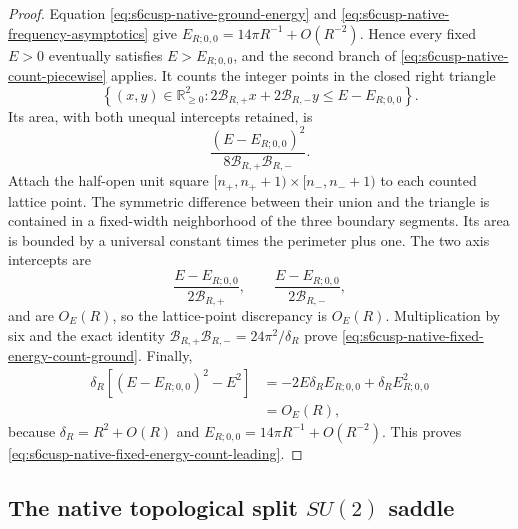 \begin{proof}
Equation \eqref{eq:s6cusp-native-ground-energy} and
\eqref{eq:s6cusp-native-frequency-asymptotics} give
\(E_{R;0,0}=14\pi R^{-1}+O(R^{-2})\).  Hence every fixed \(E>0\)
eventually satisfies \(E>E_{R;0,0}\), and the second branch of
\eqref{eq:s6cusp-native-count-piecewise} applies.  It counts the integer
points in the closed right triangle
\begin{equation}\label{eq:s6cusp-native-count-triangle}
 \left\{(x,y)\in\mathbb R_{\ge0}^2:
 2\mathcal B_{R,+}x+2\mathcal B_{R,-}y
 \le E-E_{R;0,0}\right\}.
\end{equation}
Its area, with both unequal intercepts retained, is
\begin{equation}\label{eq:s6cusp-native-count-triangle-area}
 \frac{(E-E_{R;0,0})^2}
 {8\mathcal B_{R,+}\mathcal B_{R,-}}.
\end{equation}
Attach the half-open unit square
\([n_+,n_++1)\times[n_-,n_-+1)\) to each counted lattice point.
The symmetric difference between their union and the triangle is contained
in a fixed-width neighborhood of the three boundary segments.  Its area is
bounded by a universal constant times the perimeter plus one.  The two axis
intercepts are
\begin{equation*}
 \frac{E-E_{R;0,0}}{2\mathcal B_{R,+}},
 \qquad
 \frac{E-E_{R;0,0}}{2\mathcal B_{R,-}},
\end{equation*}
and are \(O_E(R)\), so the lattice-point discrepancy is \(O_E(R)\).
Multiplication by six and the exact identity
\(\mathcal B_{R,+}\mathcal B_{R,-}=24\pi^2/\delta_R\)
prove \eqref{eq:s6cusp-native-fixed-energy-count-ground}.  Finally,
\begin{align*}
 \delta_R\left[(E-E_{R;0,0})^2-E^2\right]
 &=-2E\delta_RE_{R;0,0}
   +\delta_RE_{R;0,0}^2\\
 &=O_E(R),
\end{align*}
because \(\delta_R=R^2+O(R)\) and
\(E_{R;0,0}=14\pi R^{-1}+O(R^{-2})\).  This proves
\eqref{eq:s6cusp-native-fixed-energy-count-leading}.
\end{proof}

\subsection{The native topological split \(SU(2)\) saddle}
\label{subsec:s6cusp-native-split-su2}

